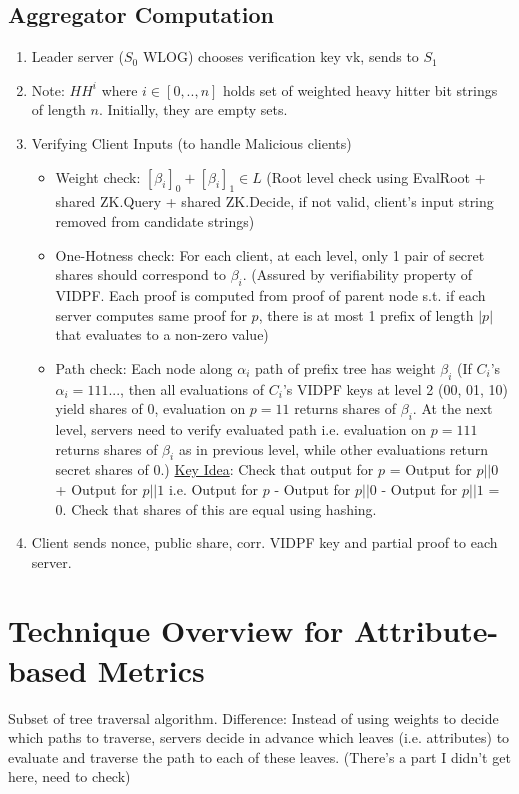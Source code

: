 \subsection{Aggregator Computation}
\begin{enumerate}
    \item Leader server ($S_0$ WLOG) chooses verification key vk, sends to $S_1$
    \item Note: $HH^i$ where $i \in [0, .., n]$ holds set of weighted heavy hitter bit strings of length $n$. Initially, they are empty sets.
    \item Verifying Client Inputs (to handle Malicious clients) 
    \begin{itemize}
        \item Weight check: $[\beta_i]_0 + [\beta_i]_1 \in L$ (Root level check using EvalRoot + shared ZK.Query + shared ZK.Decide, if not valid, client's input string removed from candidate strings)
        \item One-Hotness check: For each client, at each level, only 1 pair of secret shares should correspond to $\beta_i$. (Assured by verifiability property of VIDPF. Each proof is computed from proof of parent node s.t. if each server computes same proof for $p$, there is at most 1 prefix of length $|p|$ that evaluates to a non-zero value)
        \item Path check: Each node along $\alpha_i$ path of prefix tree has weight $\beta_i$ (If $C_i$'s $\alpha_i = 111...$, then all evaluations of $C_i$'s VIDPF keys at level 2 (00, 01, 10) yield shares of 0, evaluation on $p = 11$ returns shares of $\beta_i$. At the next level, servers need to verify evaluated path i.e. evaluation on $p = 111$ returns shares of $\beta_i$ as in previous level, while other evaluations return secret shares of 0.) \underline{Key Idea}: Check that output for $p$ = Output for $p || 0$ + Output for $p || 1$ i.e. Output for $p$ - Output for $p || 0$ - Output for $p || 1$ = 0. Check that shares of this are equal using hashing.
    \end{itemize}
    \item Client sends nonce, public share, corr. VIDPF key and partial proof to each server.
\end{enumerate}

\section{Technique Overview for Attribute-based Metrics}
Subset of tree traversal algorithm. Difference: Instead of using weights to decide which paths to traverse, servers decide in advance which leaves (i.e. attributes) to evaluate and traverse the path to each of these leaves. (There's a part I didn't get here, need to check) \\


